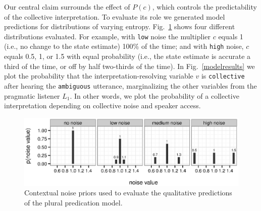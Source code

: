 \documentclass[linguex]{sp}
\begin{document}
Our central claim surrounds the effect of $P(c)$, which controls the predictability of the collective interpretation. To evaluate its role we generated model predictions for distributions of varying entropy.
%
%
Fig.~\ref{noises} shows four different distributions evaluated. For example, with \texttt{low} noise the multiplier $c$ equals 1 (i.e., no change to the state estimate) 100\% of the time; and with \texttt{high} noise, $c$ equals 0.5, 1, or 1.5 with equal probability (i.e., the state estimate is accurate a third of the time, or off by half two-thirds of the time).
In Fig.~\ref{modelresults} we plot the probability that the interpretation-resolving variable $v$ is \texttt{collective} after hearing the \texttt{ambiguous} utterance, marginalizing the other variables from the pragmatic listener $L_1$. In other words, we plot the probability of a collective interpretation depending on collective noise and speaker access.%

\begin{figure}[h]
	\centering
	\includegraphics[width=\linewidth]{plots/noise_plots.eps}
	\vspace{-20pt}
	\caption{Contextual noise priors used to evaluate the qualitative predictions of the plural predication model.} \label{noises}
\end{figure}
\end{document}

